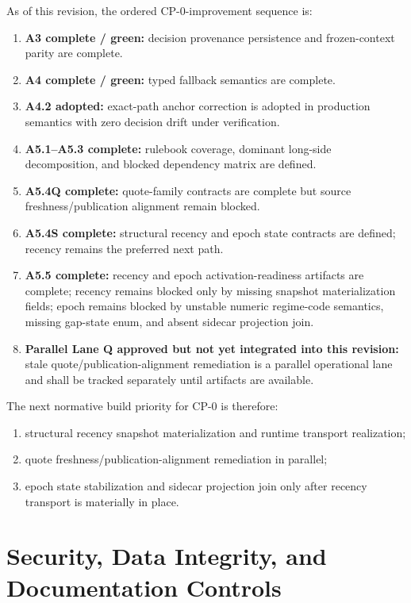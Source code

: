 \documentclass[11pt]{report}
\begin{document}
As of this revision, the ordered CP-0-improvement sequence is:
\begin{enumerate}[leftmargin=1.2cm]
    \item \textbf{A3 complete / green:} decision provenance persistence and frozen-context parity are complete.
    \item \textbf{A4 complete / green:} typed fallback semantics are complete.
    \item \textbf{A4.2 adopted:} exact-path anchor correction is adopted in production semantics with zero decision drift under verification.
    \item \textbf{A5.1--A5.3 complete:} rulebook coverage, dominant long-side decomposition, and blocked dependency matrix are defined.
    \item \textbf{A5.4Q complete:} quote-family contracts are complete but source freshness/publication alignment remain blocked.
    \item \textbf{A5.4S complete:} structural recency and epoch state contracts are defined; recency remains the preferred next path.
    \item \textbf{A5.5 complete:} recency and epoch activation-readiness artifacts are complete; recency remains blocked only by missing snapshot materialization fields; epoch remains blocked by unstable numeric regime-code semantics, missing gap-state enum, and absent sidecar projection join.
    \item \textbf{Parallel Lane Q approved but not yet integrated into this revision:} stale quote/publication-alignment remediation is a parallel operational lane and shall be tracked separately until artifacts are available.
\end{enumerate}

The next normative build priority for CP-0 is therefore:
\begin{enumerate}[leftmargin=1.2cm]
    \item structural recency snapshot materialization and runtime transport realization;
    \item quote freshness/publication-alignment remediation in parallel;
    \item epoch state stabilization and sidecar projection join only after recency transport is materially in place.
\end{enumerate}


\chapter{Security, Data Integrity, and Documentation Controls}
\end{document}
